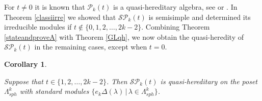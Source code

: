 \documentclass[10pt,hidelinks]{article}
\newcommand{\ParAlg}{{\mathcal P }_{k}}
\newcommand{\SpheAlg}{{\mathcal{SP} }_{k}}
\newtheorem{corollary}[theorem]{Corollary}
\numberwithin{equation}{section}
\begin{document}
For $ t \neq 0 $ it is known that $  \ParAlg(t)$ is a quasi-hereditary algebra,  
see \cite{Donkin2} or \cite{KoXi2}. In Theorem \ref{classiirre} we showed that $ \SpheAlg(t) $ is semisimple
and determined its irreducible modules if
$ t \notin \{0, 1,2,\ldots, 2k-2\} $. Combining 
Theorem \ref{stateandproveA} with Theorem \ref{GLqh}, we now obtain the quasi-heredity of 
$ \SpheAlg(t) $ in the remaining cases, except when  $ t=0$. 
\begin{corollary}\label{quasiheriditarySphe}



  
Suppose that $ t \in \{ 1,2,\ldots, 2k-2\} $. Then   
$\SpheAlg(t) $ is quasi-hereditary on the poset $ \Lambda_{sph}^{k}  $ 
with standard modules $ \{ e_k \Delta(\lambda) \, | \, \lambda \in \Lambda_{sph}^{k} \} $.
\end{corollary}  
\end{document}
